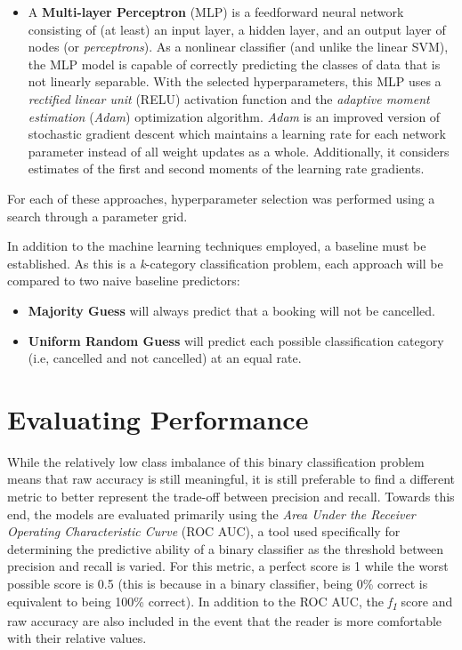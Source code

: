 \documentclass[10pt,conference]{IEEEtran}
\begin{document}
\begin{itemize}
    \item A \textbf{Multi-layer Perceptron} (MLP) is a feedforward neural network consisting of (at least) an input layer, a hidden layer, and an output layer of nodes (or \emph{perceptrons}). As a nonlinear classifier (and unlike the linear SVM), the MLP model is capable of correctly predicting the classes of data that is not linearly separable. With the selected hyperparameters, this MLP uses a \emph{rectified linear unit} (RELU) activation function and the \emph{adaptive moment estimation} (\emph{Adam}) optimization algorithm. \emph{Adam} is an improved version of stochastic gradient descent which maintains a learning rate for each network parameter instead of all weight updates as a whole\cite{Kingma2015AdamAM}. Additionally, it considers estimates of the first and second moments of the learning rate gradients\cite{Kingma2015AdamAM}.
  \end{itemize}
  For each of these approaches, hyperparameter selection was performed using a search through a parameter grid.
  
  In addition to the machine learning techniques employed, a baseline must be established. As this is a \emph{k}-category classification problem, each approach will be compared to two naive baseline predictors:
  \begin{itemize}
    \item \textbf{Majority Guess} will always predict that a booking will not be cancelled.
    \item \textbf{Uniform Random Guess} will predict each possible classification category (i.e, cancelled and not cancelled) at an equal rate.
  \end{itemize}
  

\section{Evaluating Performance}
 While the relatively low class imbalance of this binary classification problem means that raw accuracy is still meaningful, it is still preferable to find a different metric to better represent the trade-off between precision and recall. Towards this end, the models are evaluated primarily using the \emph{Area Under the Receiver Operating Characteristic Curve} (ROC AUC), a tool used specifically for determining the predictive ability of a binary classifier as the threshold between precision and recall is varied\cite{Fawcett2006}. For this metric, a perfect score is 1 while the worst possible score is 0.5 (this is because in a binary classifier, being 0\% correct is equivalent to being 100\% correct). In addition to the ROC AUC, the \emph{f\textsubscript{1}} score\cite{rijsbergen_1995} and raw accuracy are also included in the event that the reader is more comfortable with their relative values.
 
\end{document}
